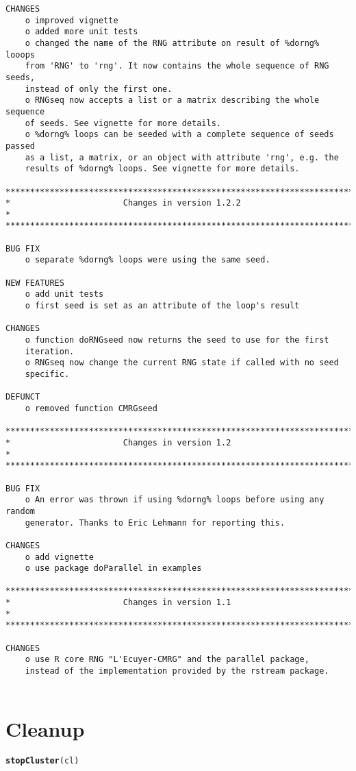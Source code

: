 \documentclass[a4paper,12pt]{article}\usepackage[]{graphicx}\usepackage[]{color}
\makeatletter
\newcommand{\hlstd}[1]{\textcolor[rgb]{0.345,0.345,0.345}{#1}}%
\newcommand{\hlkwd}[1]{\textcolor[rgb]{0.737,0.353,0.396}{\textbf{#1}}}%
\newenvironment{kframe}{%
 \def\at@end@of@kframe{}%
 \ifinner\ifhmode%
  \def\at@end@of@kframe{\end{minipage}}%
  \begin{minipage}{\columnwidth}%
 \fi\fi%
 \def\FrameCommand##1{\hskip\@totalleftmargin \hskip-\fboxsep
 \colorbox{shadecolor}{##1}\hskip-\fboxsep
     \hskip-\linewidth \hskip-\@totalleftmargin \hskip\columnwidth}%
 \MakeFramed {\advance\hsize-\width
   \@totalleftmargin\z@ \linewidth\hsize
   \@setminipage}}%
 {\par\unskip\endMakeFramed%
 \at@end@of@kframe}
\newenvironment{knitrout}{}{} %
\makeatother
\begin{document}
{\begin{verbatim}
CHANGES
    o improved vignette
    o added more unit tests
    o changed the name of the RNG attribute on result of %dorng% looops 
    from 'RNG' to 'rng'. It now contains the whole sequence of RNG seeds, 
    instead of only the first one.
    o RNGseq now accepts a list or a matrix describing the whole sequence 
    of seeds. See vignette for more details.
    o %dorng% loops can be seeded with a complete sequence of seeds passed 
    as a list, a matrix, or an object with attribute 'rng', e.g. the 
    results of %dorng% loops. See vignette for more details.
    
*************************************************************************
*                       Changes in version 1.2.2                        *
*************************************************************************

BUG FIX
    o separate %dorng% loops were using the same seed.

NEW FEATURES
    o add unit tests
    o first seed is set as an attribute of the loop's result

CHANGES
    o function doRNGseed now returns the seed to use for the first 
    iteration.
    o RNGseq now change the current RNG state if called with no seed 
    specific.  
    
DEFUNCT
    o removed function CMRGseed

*************************************************************************
*                       Changes in version 1.2                          *
*************************************************************************

BUG FIX
    o An error was thrown if using %dorng% loops before using any random
    generator. Thanks to Eric Lehmann for reporting this.

CHANGES
    o add vignette
    o use package doParallel in examples

*************************************************************************
*                       Changes in version 1.1                          *
*************************************************************************

CHANGES
    o use R core RNG "L'Ecuyer-CMRG" and the parallel package, 
    instead of the implementation provided by the rstream package.


\end{verbatim}
}


\section*{Cleanup}
\begin{knitrout}\footnotesize
{}\color{fgcolor}\begin{kframe}
\begin{alltt}
\hlkwd{stopCluster}\hlstd{(cl)}
\end{alltt}
\end{kframe}
\end{knitrout}
\end{document}
